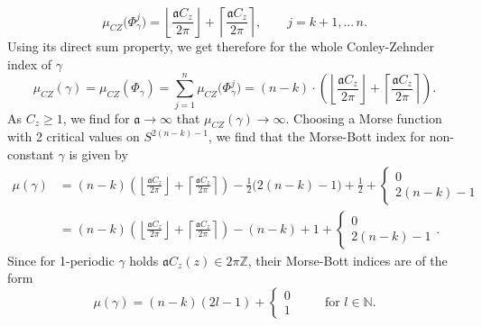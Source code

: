 \documentclass[a4paper,12pt,bibliography=totocnumbered,titlepage=false,abstracton,bookmarksnumbered=true]{scrartcl}
\theoremstyle{definition}
\begin{document}
\[\mu_{CZ}\big(\Phi^j_\gamma\big)= \left\lfloor\frac{\mathfrak{a} C_z}{2\pi}\right\rfloor+\left\lceil\frac{\mathfrak{a} C_z}{2\pi}\right\rceil,\qquad j=k{+}1,...\,n.\]
Using its direct sum property, we get therefore for the whole Conley-Zehnder index of $\gamma$
\[\mu_{CZ}(\gamma)=\mu_{CZ}(\Phi_\gamma) =\sum_{j=1}^n \mu_{CZ}\big(\Phi^j_\gamma\big)
=(n{-}k)\cdot \left(\left\lfloor\frac{\mathfrak{a} C_z}{2\pi}\right\rfloor+\left\lceil\frac{\mathfrak{a} C_z}{2\pi}\right\rceil\right).\]
As $C_z\geq 1$, we find for $\mathfrak{a}\rightarrow\infty$ that $\mu_{CZ}(\gamma)\rightarrow \infty$. Choosing a Morse function with 2 critical values on $S^{2(n-k)-1}$, we find that the Morse-Bott index for non-constant $\gamma$ is given by
\begin{align*}
 \mu(\gamma)&=(n{-}k)\left(\left\lfloor\frac{\mathfrak{a} C_z}{2\pi}\right\rfloor+\left\lceil\frac{\mathfrak{a} C_z}{2\pi}\right\rceil\right)-\frac{1}{2}\big(2(n{-}k)-1\big)+\frac{1}{2}+\left\lbrace\begin{smallmatrix}0\\2(n-k)-1\end{smallmatrix}\right.\\
 &=(n{-}k)\left(\left\lfloor\frac{\mathfrak{a} C_z}{2\pi}\right\rfloor+\left\lceil\frac{\mathfrak{a} C_z}{2\pi}\right\rceil\right)-(n{-}k)+1+\left\lbrace\begin{smallmatrix}0\\2(n-k)-1\end{smallmatrix}\right..
\end{align*}
Since for 1-periodic $\gamma$ holds $\mathfrak{a} C_z(z) \in 2\pi\mathbb{Z}$, their Morse-Bott indices are of the form
\begin{equation}\label{indexonhandle}
 \mu(\gamma)=(n{-}k)(2l{-}1)+\left\lbrace\begin{smallmatrix}0\\1\end{smallmatrix}\right.\qquad\text{ for } l\in\mathbb{N}.
\end{equation}
\end{document}
